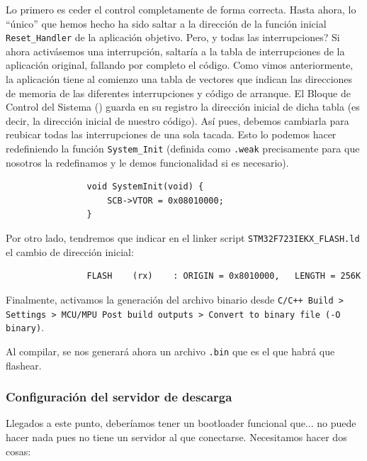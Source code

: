 \documentclass[../main.tex]{subfiles}
\begin{document}
            Lo primero es ceder el control completamente de forma correcta. Hasta ahora, lo ``único'' que hemos hecho ha sido saltar a la dirección de la función inicial \texttt{Reset\_Handler} de la aplicación objetivo. Pero, y todas las interrupciones? Si ahora activásemos una interrupción, saltaría a la tabla de interrupciones de la aplicación original, fallando por completo el código. Como vimos anteriormente, la aplicación tiene al comienzo una tabla de vectores que indican las direcciones de memoria de las diferentes interrupciones y código de arranque. El Bloque de Control del Sistema  (\PMMAN[4.3]) guarda en su registro  la dirección inicial de dicha tabla (es decir, la dirección inicial de nuestro código). Así pues, debemos cambiarla para reubicar todas las interrupciones de una sola tacada. Esto lo podemos hacer redefiniendo la función \texttt{System\_Init} (definida como \texttt{.weak} precisamente para que nosotros la redefinamos y le demos funcionalidad si es necesario).

            \begin{lstlisting}
                void SystemInit(void) {
                    SCB->VTOR = 0x08010000; 
                }
            \end{lstlisting}

            Por otro lado, tendremos que indicar en el linker script \texttt{STM32F723IEKX\_FLASH.ld} el cambio de dirección inicial:

            \begin{lstlisting}
                FLASH    (rx)    : ORIGIN = 0x8010000,   LENGTH = 256K
            \end{lstlisting}
            
            Finalmente, activamos la generación del archivo binario desde \texttt{C/C++ Build > Settings > MCU/MPU Post build outputs > Convert to binary file (-O binary)}.

            Al compilar, se nos generará ahora un archivo \texttt{.bin} que es el que habrá que flashear.


        \subsubsection{Configuración del servidor de descarga}

            Llegados a este punto, deberíamos tener un bootloader funcional que... no puede hacer nada pues no tiene un servidor al que conectarse. Necesitamos hacer dos cosas:
\end{document}
